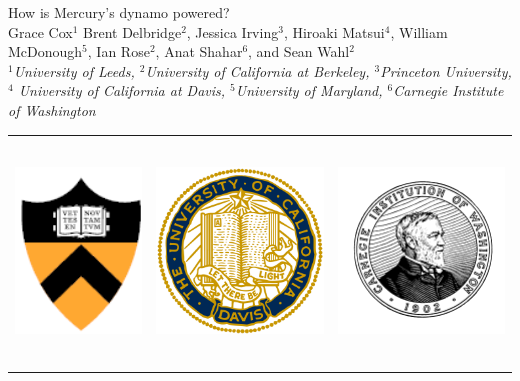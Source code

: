 \documentclass[landscape,a0b,final]{a0poster}
\begin{document}
\begin{center}
\begin{minipage}[c][9cm][c]{0.1\textwidth}
\begin{center}
\begin{tabular}{ccc}
    \end{tabular}
  \end{center}
\end{minipage}
\begin{minipage}[c][9cm][c]{0.78\textwidth}
  \begin{center}
    {\sc \Huge How is Mercury's dynamo powered?}\\[10mm]
    {\Large Grace Cox$^1$ Brent Delbridge$^2$, Jessica Irving$^3$, Hiroaki Matsui$^4$, William McDonough$^5$, Ian Rose$^2$, Anat Shahar$^6$, and Sean Wahl$^2$}\\[7.5mm]
    \emph{ $^1$University of Leeds, $^2$University of California at Berkeley, $^3$Princeton University, $^4$ University of California at Davis, $^5$University of Maryland, $^6$Carnegie Institute of Washington}\\[7.5mm]
  \end{center}
\end{minipage}
\hspace*{-9cm}
\begin{minipage}[c][9cm][c]{0.1\textwidth}
  \begin{center}
    \begin{tabular}{ccc}
    \includegraphics[height=6cm,angle=0]{princeton.png} &
    \includegraphics[height=6cm,angle=0]{davis.png} &
    \includegraphics[height=6cm,angle=0]{carnegie.png} 

\end{tabular}
\end{center}
\end{minipage}
\end{center}
\end{document}

